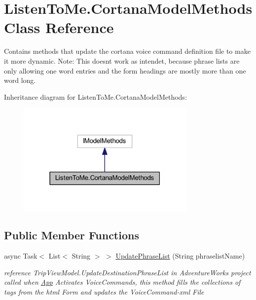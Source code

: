 \hypertarget{class_listen_to_me_1_1_cortana_model_methods}{}\section{Listen\+To\+Me.\+Cortana\+Model\+Methods Class Reference}
\label{class_listen_to_me_1_1_cortana_model_methods}


Contains methods that update the cortana voice command definition file to make it more dynamic. Note\+: This doesn\textquotesingle{}t work as intendet, because phrase lists are only allowing one word entries and the form headings are mostly more than one word long.  




Inheritance diagram for Listen\+To\+Me.\+Cortana\+Model\+Methods\+:\nopagebreak
\begin{figure}[H]
\begin{center}
\leavevmode
\includegraphics[width=247pt]{class_listen_to_me_1_1_cortana_model_methods__inherit__graph}
\end{center}
\end{figure}
\subsection*{Public Member Functions}
\begin{DoxyCompactItemize}
\item 
async Task$<$ List$<$ String $>$ $>$ \hyperlink{class_listen_to_me_1_1_cortana_model_methods_afe872337c3f1c74f5db6e26918f29ac1}{Update\+Phrase\+List} (String phraselist\+Name)
\begin{DoxyCompactList}\small\item\em reference Trip\+View\+Model.\+Update\+Destination\+Phrase\+List in Adventure\+Works project called when \hyperlink{class_listen_to_me_1_1_app}{App} Activates Voice\+Commands, this method fills the collections of tags from the html Form and updates the Voice\+Command-\/xml File \end{DoxyCompactList}\end{DoxyCompactItemize}


